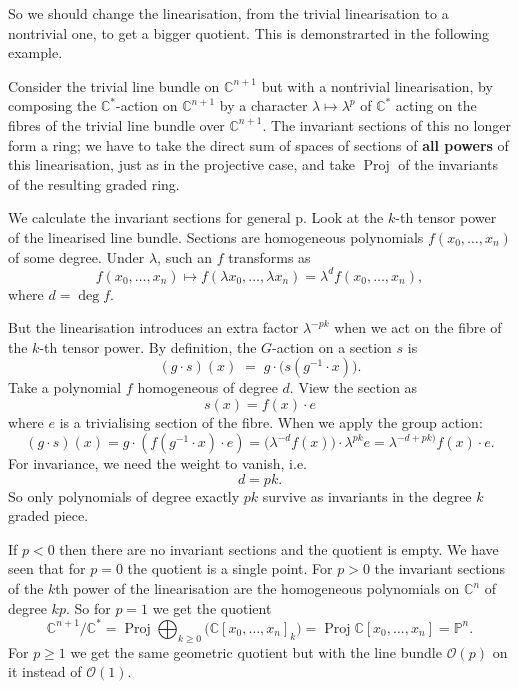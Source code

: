 \documentclass[12pt]{article}
\begin{document}
So we should change the linearisation, from the trivial linearisation to a nontrivial one, to get a bigger quotient. This is demonstrarted in the following example.

\begin{example}
  Consider the trivial line bundle on $\mathbb{C}^{n+1}$ but with a nontrivial
  linearisation, by composing the $\mathbb{C}^*$-action on $\mathbb{C}^{n+1}$ by a character
  $\lambda \mapsto \lambda^{p}$ of $\mathbb{C}^*$ acting on the fibres of the trivial line
  bundle over $\mathbb{C}^{n+1}$. The invariant sections of this no longer form a ring; we
  have to take the direct sum of spaces of sections of \textbf{all powers} of this linearisation,
  just as in the projective case, and take $\operatorname{Proj}$ of the invariants of the
  resulting graded ring.

  We calculate the invariant sections for general p. Look at the $k$-th tensor power of the linearised line bundle. Sections are homogeneous polynomials $f(x_0,\dots,x_n)$ of some degree. Under $\lambda$, such an $f$ transforms as
  \[
    f(x_0,\dots,x_n) \mapsto f(\lambda x_0,\dots,\lambda x_n) = \lambda^d f(x_0,\dots,x_n),
  \]
  where $d=\deg f$.

  But the linearisation introduces an extra factor $\lambda^{-pk}$ when we act on the fibre of the $k$-th tensor power. By definition, the $G$-action on a section $s$ is
  \[
    (g\cdot s)(x) \;=\; g\cdot \big(s(g^{-1}\cdot x)\big).
  \]
  Take a polynomial $f$ homogeneous of degree $d$. View the section as
  \[s(x) = f(x)\cdot e\]
  where $e$ is a trivialising section of the fibre. When we apply the group action:
  \[
    (g\cdot s)(x) = g\cdot(f(g^{-1}\cdot x)\cdot e)
    = \big(\lambda^{-d} f(x)\big)\cdot \lambda^{pk} e
    = \lambda^{-d+pk)} f(x)\cdot e.
  \]
  For invariance, we need the weight to vanish, i.e.
  \[
    d = pk.
  \]
  So only polynomials of degree exactly $pk$ survive as invariants in the degree $k$ graded piece.

  If $p<0$ then there are no invariant sections and the quotient is empty. We have seen that
  for $p=0$ the quotient is a single point. For $p>0$ the invariant sections of the $k$th
  power of the linearisation are the homogeneous polynomials on $\mathbb{C}^n$ of degree $kp$.
  So for $p=1$ we get the quotient
  \begin{equation}
    \mathbb{C}^{n+1}/\mathbb{C}^*
    = \operatorname{Proj} \bigoplus_{k\ge 0} \big(\mathbb{C}[x_0,\dots,x_n]_k\big)
    = \operatorname{Proj} \mathbb{C}[x_0,\dots,x_n] = \mathbb{P}^n.
  \end{equation}
  For $p\ge 1$ we get the same geometric quotient but with the line bundle
  $\mathcal{O}(p)$ on it instead of $\mathcal{O}(1)$.


\end{example}
\end{document}
